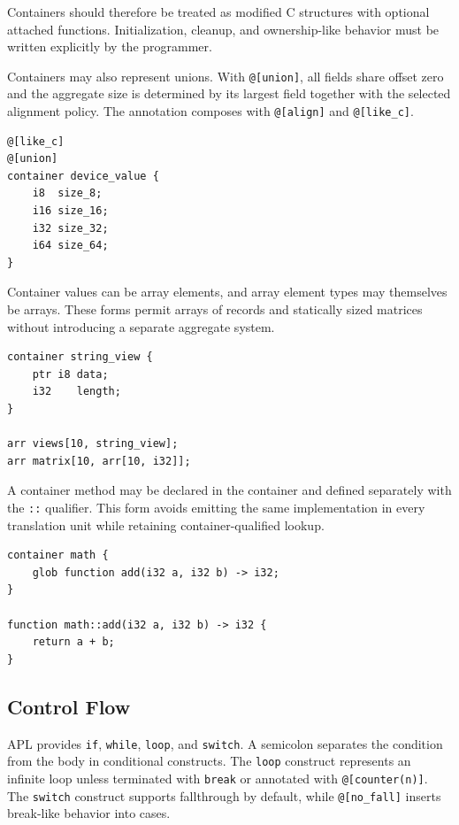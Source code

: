 \documentclass[10pt,twocolumn]{article}
\begin{document}
\par Containers should therefore be treated as modified C structures with optional attached functions. Initialization, cleanup, and ownership-like behavior must be written explicitly by the programmer.
\par Containers may also represent unions. With \texttt{@[union]}, all fields share offset zero and the aggregate size is determined by its largest field together with the selected alignment policy. The annotation composes with \texttt{@[align]} and \texttt{@[like\_c]}.

\begin{lstlisting}[language=APL,caption={Union container with C-compatible layout.}]
@[like_c]
@[union]
container device_value {
    i8  size_8;
    i16 size_16;
    i32 size_32;
    i64 size_64;
}
\end{lstlisting}

\par Container values can be array elements, and array element types may themselves be arrays. These forms permit arrays of records and statically sized matrices without introducing a separate aggregate system.

\begin{lstlisting}[language=APL,caption={Arrays of containers and nested arrays.}]
container string_view {
    ptr i8 data;
    i32    length;
}

arr views[10, string_view];
arr matrix[10, arr[10, i32]];
\end{lstlisting}

\par A container method may be declared in the container and defined separately with the \texttt{::} qualifier. This form avoids emitting the same implementation in every translation unit while retaining container-qualified lookup.

\begin{lstlisting}[language=APL,caption={Out-of-container method definition.}]
container math {
    glob function add(i32 a, i32 b) -> i32;
}

function math::add(i32 a, i32 b) -> i32 {
    return a + b;
}
\end{lstlisting}

\subsection{Control Flow}
\par APL provides \texttt{if}, \texttt{while}, \texttt{loop}, and \texttt{switch}. A semicolon separates the condition from the body in conditional constructs. The \texttt{loop} construct represents an infinite loop unless terminated with \texttt{break} or annotated with \texttt{@[counter(n)]}. The \texttt{switch} construct supports fallthrough by default, while \texttt{@[no\_fall]} inserts break-like behavior into cases.
\end{document}
